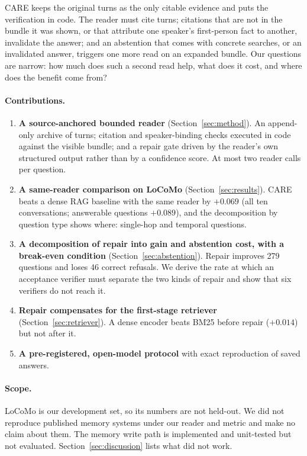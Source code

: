\documentclass[10pt]{article}
\theoremstyle{plain}
\newcommand{\care}{\textsc{CARE}}
\begin{document}
\care{} keeps the original turns as the only citable evidence and puts the verification in code. The reader must
cite turns; citations that are not in the bundle it was shown, or that attribute one speaker's first-person fact to
another, invalidate the answer; and an abstention that comes with concrete searches, or an invalidated answer,
triggers one more read on an expanded bundle. Our questions are narrow: how much does such a second read help, what
does it cost, and where does the benefit come from?

\paragraph{Contributions.}
\begin{enumerate}
  \item \textbf{A source-anchored bounded reader} (Section~\ref{sec:method}). An append-only archive of turns;
  citation and speaker-binding checks executed in code against the visible bundle; and a repair gate driven by the
  reader's own structured output rather than by a confidence score. At most two reader calls per question.
  \item \textbf{A same-reader comparison on LoCoMo} (Section~\ref{sec:results}). \care{} beats a dense RAG baseline
  with the same reader by $+0.069$ (all ten conversations; answerable questions $+0.089$), and the decomposition by
  question type shows where: single-hop and temporal questions.
  \item \textbf{A decomposition of repair into gain and abstention cost, with a break-even condition}
  (Section~\ref{sec:abstention}). Repair improves 279 questions and loses 46 correct refusals. We derive the rate at
  which an acceptance verifier must separate the two kinds of repair and show that six verifiers do not reach it.
  \item \textbf{Repair compensates for the first-stage retriever} (Section~\ref{sec:retriever}). A dense encoder
  beats BM25 before repair ($+0.014$) but not after it.
  \item \textbf{A pre-registered, open-model protocol} with exact reproduction of saved answers.
\end{enumerate}

\paragraph{Scope.} LoCoMo is our development set, so its numbers are not held-out. We did not reproduce published
memory systems under our reader and metric and make no claim about them. The memory write path is implemented and
unit-tested but not evaluated. Section~\ref{sec:discussion} lists what did not work.
\end{document}
